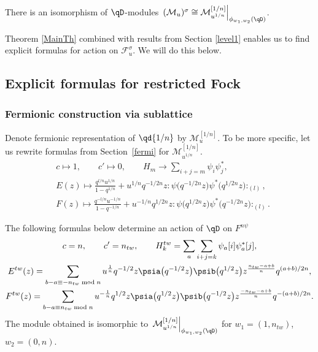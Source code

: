 \begin{Corollary}There is an isomorphism of $\qD$-modules $\left. ( \mathcal{M}_{u} )^{ \sigma } \cong \mathcal{M}^{[1/n]}_{u^{1/n}} \right|_{\phi_{w_1,w_2} (\qD ) }$.
\end{Corollary}

Theorem \ref{MainTh} combined with results from Section \ref{level1} enables us to find explicit formulas for action on $\mathcal{F}_{u}^{ \sigma }$. We will do this below.

\subsection{Explicit formulas for restricted Fock}
\subsubsection{Fermionic construction via sublattice}
Denote fermionic representation of $\qd{1/n}$ by $\mathcal{M}^{[1/n]}_u$. To be more specific, let us rewrite formulas from Section~\ref{fermi} for $\mathcal{M}^{[1/n]}_{u^{1/n}}$.
\begin{align}
&c \mapsto 1, \qquad c' \mapsto 0, \qquad H_m \rightarrow \sum_{i+j=m} \psi_i \psi_j^*, \nonumber\\
&E(z) \mapsto \frac{q^{l/n} u^{1/n} }{1-q^{1/n}} + u^{1/n} q^{ - 1/2n }z : \! \psi\big( q^{-1/2n} z\big) \psi^* \big( q^{1/2n} z\big) \! :_{(l)} ,
\label{ferm:En} \\
&F(z) \mapsto \frac{q^{-l/n} u^{-1/n} }{1-q^{-1/n}} + u^{-1/n} q^{1/2n} z : \! \psi\big( q^{1/2n} z\big) \psi^* \big(q^{-1/2n} z\big)\!:_{(l)}.
\label{ferm:Fn}
\end{align}
\begin{Proposition} \label{TheFermionicProp}
The following formulas below determine an action of $\qD$ on $F^{n\psi}$
\begin{gather}
c=n, \qquad c' = n_{tw}, \qquad
H^{tw}_k = \sum_{a} \sum_{i+j=k} \psi_a [i] \psi^*_a [j] , \label{eq1: TheFermionicProp} \\
E^{tw}(z) = \sum_{b-a \equiv -n_{tw} \bmod n} u^{\frac{1}{n}} q^{-1/2} z \psia \big( q^{-1/2} z\big) \psib \big(q^{1/2} z\big) z^{\frac{n_{tw}-a+b}{n}} q^{(a+b)/2n}, \label{prop:EtwFermi} \\
F^{tw}(z) = \sum_{b-a \equiv n_{tw} \bmod n} u^{-\frac{1}{n}} q^{1/2} z \psia \big( q^{1/2} z\big) \psib \big(q^{-1/2} z\big) z^{\frac{-n_{tw}-a+b}{n}} q^{-(a+b)/2n}. \label{prop:FtwFermi}
\end{gather}
The module obtained is isomorphic to $\left. \mathcal{M}^{[1/n]}_{u^{1/n}} \right|_{\phi_{w_1, w_2}(\qD)}$ for $w_1=(1, n_{tw})$, $w_2=(0,n)$.
\end{Proposition}

